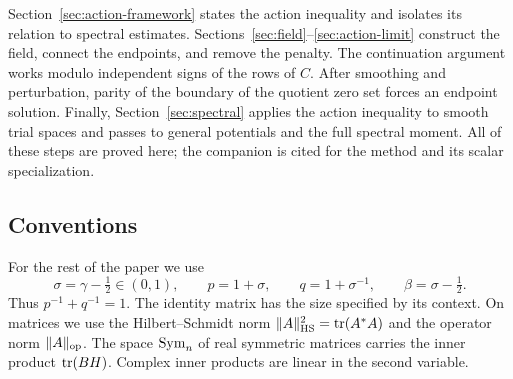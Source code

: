 Section~\ref{sec:action-framework} states the action inequality and isolates
its relation to spectral estimates. Sections~\ref{sec:field}--\ref{sec:action-limit}
construct the field, connect the endpoints, and remove the penalty. The
continuation argument works modulo independent signs of the rows of $C$.
After smoothing and perturbation, parity of the boundary of the quotient
zero set forces an endpoint solution. Finally,
Section~\ref{sec:spectral} applies the action inequality to smooth trial
spaces and passes to general potentials and the full spectral moment.
All of these steps are proved here; the companion is cited for the method
and its scalar specialization.

\subsection{Conventions}
For the rest of the paper we use
\begin{equation}\label{eq:exponents}
 \sigma=\gamma-\tfrac12\in(0,1),\qquad
 p=1+\sigma,\qquad q=1+\sigma^{-1},\qquad
 \beta=\sigma-\tfrac12.
\end{equation}
Thus $p^{-1}+q^{-1}=1$. The identity matrix has the size specified by its
context. On matrices we use the Hilbert--Schmidt norm
$\|A\|_{\mathrm{HS}}^2=\operatorname{tr}(A^*A)$ and the operator norm $\|A\|_{\operatorname{op}}$.
The space $\operatorname{Sym}_n$ of real symmetric matrices carries the inner product
$\operatorname{tr}(BH)$. Complex inner products are linear in the second variable.
